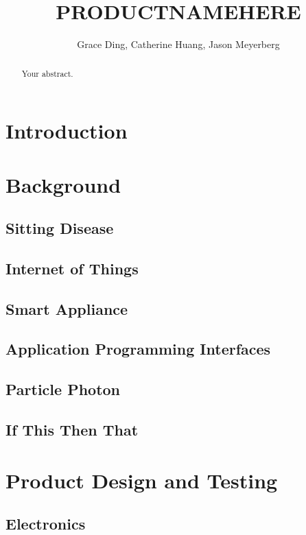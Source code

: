 \documentclass[a4paper]{article}
\title{PRODUCTNAMEHERE}
\author{Grace Ding, Catherine Huang, Jason Meyerberg
\date{}
}
\begin{document}
\maketitle

\begin{abstract}
Your abstract.
\end{abstract}

\section{Introduction}

\section{Background}

\subsection{Sitting Disease}

\subsection{Internet of Things}

\subsection{Smart Appliance}

\subsection{Application Programming Interfaces}

\subsection{Particle Photon}

\subsection{If This Then That}

\section{Product Design and Testing}

\subsection{Electronics}
\end{document}
